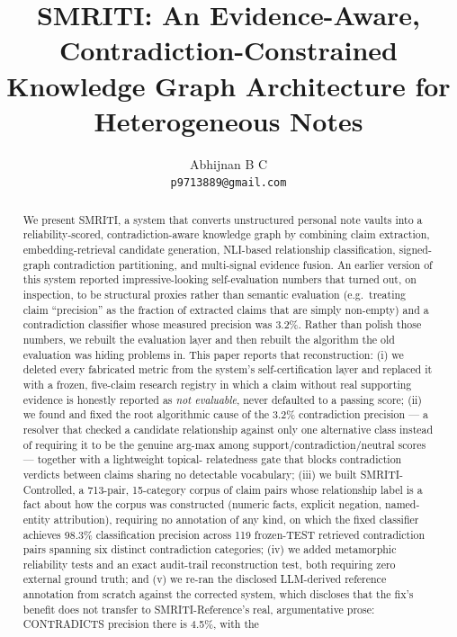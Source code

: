 \documentclass[11pt]{article}
\title{SMRITI: An Evidence-Aware, Contradiction-Constrained Knowledge Graph Architecture for Heterogeneous Notes}
\author{Abhijnan B C \\
  \texttt{p9713889@gmail.com} \\}
\begin{document}
\maketitle

\begin{abstract}
We present SMRITI, a system that converts unstructured personal note
vaults into a reliability-scored, contradiction-aware knowledge graph by
combining claim extraction, embedding-retrieval candidate generation,
NLI-based relationship classification, signed-graph contradiction
partitioning, and multi-signal evidence fusion. An earlier version of this
system reported impressive-looking self-evaluation numbers that turned out,
on inspection, to be structural proxies rather than semantic evaluation
(e.g.\ treating claim ``precision'' as the fraction of extracted claims
that are simply non-empty) and a contradiction classifier whose measured
precision was 3.2\%. Rather than polish those numbers, we rebuilt the
evaluation layer and then rebuilt the algorithm the old evaluation was
hiding problems in. This paper reports that reconstruction: (i) we
deleted every fabricated metric from the system's self-certification layer
and replaced it with a frozen, five-claim research registry in which a
claim without real supporting evidence is honestly reported as
\emph{not evaluable}, never defaulted to a passing score; (ii) we found and
fixed the root algorithmic cause of the 3.2\% contradiction precision --- a
resolver that checked a candidate relationship against only one alternative
class instead of requiring it to be the genuine arg-max among
support/contradiction/neutral scores --- together with a lightweight topical-
relatedness gate that blocks contradiction verdicts between claims sharing
no detectable vocabulary; (iii) we built SMRITI-Controlled, a 713-pair, 15-category
corpus of claim pairs whose relationship label is a fact about how the
corpus was constructed (numeric facts, explicit negation, named-entity
attribution), requiring no annotation of any kind, on which the fixed
classifier achieves 98.3\% classification precision across 119 frozen-TEST
retrieved contradiction pairs spanning six distinct contradiction categories; (iv) we added metamorphic reliability tests and
an exact audit-trail reconstruction test, both requiring zero external
ground truth; and (v) we re-ran the disclosed LLM-derived reference
annotation from scratch against the corrected system, which discloses
that the fix's benefit does not transfer to SMRITI-Reference's real,
argumentative prose: CONTRADICTS precision there is 4.5\%, with the

\end{abstract}
\end{document}
